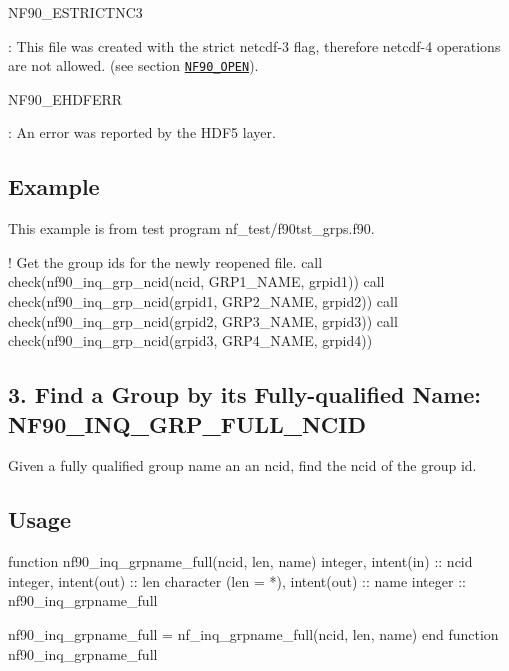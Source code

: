 {\ttfamily N\+F90\+\_\+\+E\+S\+T\+R\+I\+C\+T\+N\+C3}

\+: This file was created with the strict netcdf-\/3 flag, therefore netcdf-\/4 operations are not allowed. (see section \href{#NF90_005fOPEN}{\tt N\+F90\+\_\+\+O\+P\+EN}).

{\ttfamily N\+F90\+\_\+\+E\+H\+D\+F\+E\+RR}

\+: An error was reported by the H\+D\+F5 layer.

\subsection*{Example}

This example is from test program nf\+\_\+test/f90tst\+\_\+grps.\+f90.


\begin{DoxyCode}
\textcolor{comment}{! Get the group ids for the newly reopened file.}
\textcolor{comment}{call check(nf90\_inq\_grp\_ncid(ncid, GRP1\_NAME, grpid1))}
\textcolor{comment}{call check(nf90\_inq\_grp\_ncid(grpid1, GRP2\_NAME, grpid2))}
\textcolor{comment}{call check(nf90\_inq\_grp\_ncid(grpid2, GRP3\_NAME, grpid3))}
\textcolor{comment}{call check(nf90\_inq\_grp\_ncid(grpid3, GRP4\_NAME, grpid4))}
\end{DoxyCode}
\hypertarget{f90_groups_f90-find-a-group-by-its-fully-qualified-name-nf90_inq_grp_full_ncid}{}\subsection{3. Find a Group by its Fully-\/qualified Name\+: N\+F90\+\_\+\+I\+N\+Q\+\_\+\+G\+R\+P\+\_\+\+F\+U\+L\+L\+\_\+\+N\+C\+I\+D }\label{f90_groups_f90-find-a-group-by-its-fully-qualified-name-nf90_inq_grp_full_ncid}
Given a fully qualified group name an an ncid, find the ncid of the group id.

\subsection*{Usage}


\begin{DoxyCode}
\textcolor{keyword}{function }nf90\_inq\_grpname\_full(ncid, len, name)
  \textcolor{keywordtype}{integer}, \textcolor{keywordtype}{intent(in)} :: ncid
  \textcolor{keywordtype}{integer}, \textcolor{keywordtype}{intent(out)} :: len
  \textcolor{keywordtype}{character (len = *)}, \textcolor{keywordtype}{intent(out)} :: name
  \textcolor{keywordtype}{integer} :: nf90\_inq\_grpname\_full

  nf90\_inq\_grpname\_full = nf\_inq\_grpname\_full(ncid, len, name)
\textcolor{keyword}{end function }nf90\_inq\_grpname\_full
\end{DoxyCode}



